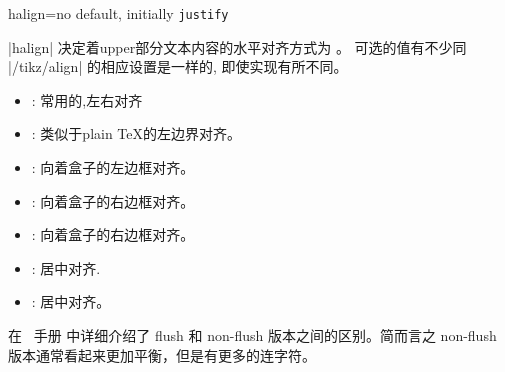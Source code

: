 \begin{docTcbKey}[][doc new=2015-05-07]{halign}{=}{no default, initially \texttt{justify}}

|halign| 决定着upper部分文本内容的水平对齐方式为 。
 可选的值有不少同 |/tikz/align| 的相应设置是一样的, 即使实现有所不同。
\begin{itemize}
\item{}:%
常用的,左右对齐%
\item{}: %
类似于plain \TeX 的左边界对齐。
\item{}: 
向着盒子的左边框对齐。%
\item{}: %
向着盒子的右边框对齐。%
\item{}: %
向着盒子的右边框对齐。%
\item{}: %
居中对齐.%
\item{}: %
居中对齐。%
\end{itemize}

在 \tikzname\ 手册 %
中详细介绍了 flush 和 non-flush 版本之间的区别。简而言之 non-flush 版本通常看起来更加平衡，但是有更多的连字符。


\end{docTcbKey}
